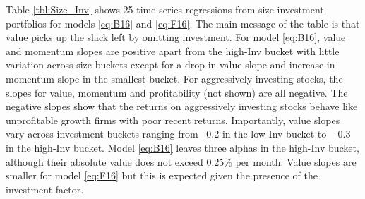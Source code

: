 
Table \ref{tbl:Size_Inv} shows 25 time series regressions from size-investment
portfolios for models \ref{eq:B16} and \ref{eq:F16}.
The main message of the table is that value picks up the slack left by
omitting investment.
For model \ref{eq:B16},
value and momentum slopes are positive apart from the high-Inv bucket
with little variation across size buckets except for a drop in value slope and
increase in momentum slope in the smallest bucket.
For aggressively investing stocks, the slopes for value, momentum and
profitability (not shown) are all negative.
The negative slopes show that the returns on aggressively investing stocks
behave like unprofitable growth firms with poor recent returns.
Importantly, value slopes vary across investment buckets ranging from ~0.2 in
the low-Inv bucket to ~-0.3 in the high-Inv bucket.
Model \ref{eq:B16} leaves three alphas in the high-Inv bucket,
although their absolute value does not exceed 0.25\% per month.
Value slopes are smaller for model \ref{eq:F16} but this is expected given the
presence of the investment factor.

